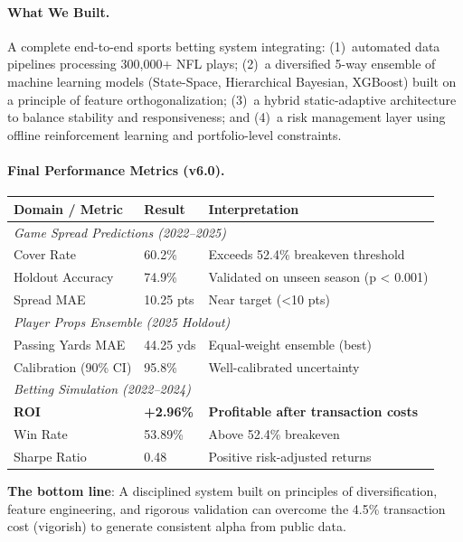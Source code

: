 \documentclass[12pt]{report}  %
\numberwithin{equation}{section}
\theoremstyle{plain}
\theoremstyle{definition}
\theoremstyle{remark}
\begin{document}
\paragraph{What We Built.}
A complete end-to-end sports betting system integrating: (1)~automated data pipelines processing 300,000+ NFL plays; (2)~a diversified 5-way ensemble of machine learning models (State-Space, Hierarchical Bayesian, XGBoost) built on a principle of feature orthogonalization; (3)~a hybrid static-adaptive architecture to balance stability and responsiveness; and (4)~a risk management layer using offline reinforcement learning and portfolio-level constraints.

\paragraph{Final Performance Metrics (v6.0).}
\begin{center}
\small
\begin{tabular}{p{3.8cm}p{2.0cm}p{5.0cm}}
\toprule
\textbf{Domain / Metric} & \textbf{Result} & \textbf{Interpretation} \\
\midrule
\multicolumn{3}{l}{\textit{Game Spread Predictions (2022--2025)}} \\
\quad Cover Rate & 60.2\% & Exceeds 52.4\% breakeven threshold \\
\quad 2025 Holdout Accuracy & 74.9\% & Validated on unseen season (p < 0.001) \\
\quad Spread MAE & 10.25 pts & Near target (<10 pts) \\
\midrule
\multicolumn{3}{l}{\textit{Player Props Ensemble (2025 Holdout)}} \\
\quad Passing Yards MAE & 44.25 yds & Equal-weight ensemble (best) \\
\quad Calibration (90\% CI) & 95.8\% & Well-calibrated uncertainty \\
\midrule
\multicolumn{3}{l}{\textit{Betting Simulation (2022--2024)}} \\
\quad \textbf{ROI} & \textbf{+2.96\%} & \textbf{Profitable after transaction costs} \\
\quad Win Rate & 53.89\% & Above 52.4\% breakeven \\
\quad Sharpe Ratio & 0.48 & Positive risk-adjusted returns \\
\bottomrule
\end{tabular}
\end{center}

\noindent\textbf{The bottom line}: A disciplined system built on principles of diversification, feature engineering, and rigorous validation can overcome the 4.5\% transaction cost (vigorish) to generate consistent alpha from public data.
\end{document}
